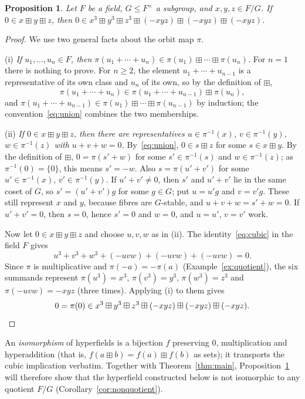\documentclass[12pt]{article}
\theoremstyle{plain}
\newtheorem{proposition}[theorem]{Proposition}
\theoremstyle{definition}
\newcommand{\bp}{\boxplus}
\begin{document}
\begin{proposition}\label{prop:quotient}
Let $F$ be a field, $G\leq F^\times$ a subgroup, and $x,y,z\in F/G$.
If $0\in x\bp y\bp z$, then
$0\in x^3\bp y^3\bp z^3\bp(-xyz)\bp(-xyz)\bp(-xyz)$.
\end{proposition}
\begin{proof}
We use two general facts about the orbit map $\pi$.

\smallskip\noindent
(i) \emph{If $u_1,\dots,u_n\in F$, then
$\pi(u_1+\cdots+u_n)\in\pi(u_1)\bp\cdots\bp\pi(u_n)$.}
For $n=1$ there is nothing to prove.  For $n\geq2$, the element
$u_1+\cdots+u_{n-1}$ is a representative of its own class and $u_n$ of
its own, so by the definition of $\bp$,
\[
 \pi(u_1+\cdots+u_n)\in\pi(u_1+\cdots+u_{n-1})\bp\pi(u_n),
\]
and $\pi(u_1+\cdots+u_{n-1})\in\pi(u_1)\bp\cdots\bp\pi(u_{n-1})$ by
induction; the convention~\eqref{eq:union} combines the two memberships.

\smallskip\noindent
(ii) \emph{If $0\in x\bp y\bp z$, then there are representatives
$u\in\pi^{-1}(x)$, $v\in\pi^{-1}(y)$, $w\in\pi^{-1}(z)$ with
$u+v+w=0$.}  By~\eqref{eq:union}, $0\in s\bp z$ for some $s\in x\bp y$.
By the definition of $\bp$, $0=\pi(s'+w)$ for some $s'\in\pi^{-1}(s)$
and $w\in\pi^{-1}(z)$; as $\pi^{-1}(0)=\{0\}$, this means $s'=-w$.
Also $s=\pi(u'+v')$ for some $u'\in\pi^{-1}(x)$, $v'\in\pi^{-1}(y)$.
If $u'+v'\neq0$, then $s'$ and $u'+v'$ lie in the same coset of $G$, so
$s'=(u'+v')g$ for some $g\in G$; put $u=u'g$ and $v=v'g$.  These still
represent $x$ and $y$, because fibres are $G$-stable, and
$u+v+w=s'+w=0$.  If $u'+v'=0$, then $s=0$, hence $s'=0$ and $w=0$, and
$u=u'$, $v=v'$ work.

\smallskip
Now let $0\in x\bp y\bp z$ and choose $u,v,w$ as in (ii).  The
identity~\eqref{eq:cubic} in the field $F$ gives
\[
 u^3+v^3+w^3+(-uvw)+(-uvw)+(-uvw)=0.
\]
Since $\pi$ is multiplicative and $\pi(-a)=-\pi(a)$
(Example~\ref{ex:quotient}), the six summands represent
$\pi(u^3)=x^3$, $\pi(v^3)=y^3$, $\pi(w^3)=z^3$ and
$\pi(-uvw)=-xyz$ (three times).  Applying (i) to them gives
\[
 0=\pi(0)\in x^3\bp y^3\bp z^3\bp(-xyz)\bp(-xyz)\bp(-xyz).\qedhere
\]
\end{proof}

An \emph{isomorphism} of hyperfields is a bijection $f$ preserving $0$,
multiplication and hyperaddition (that is, $f(a\bp b)=f(a)\bp f(b)$ as
sets); it transports the cubic implication verbatim.  Together with
Theorem~\ref{thm:main}, Proposition~\ref{prop:quotient} will therefore
show that the hyperfield constructed below is not isomorphic to any
quotient $F/G$ (Corollary~\ref{cor:nonquotient}).
\end{document}
